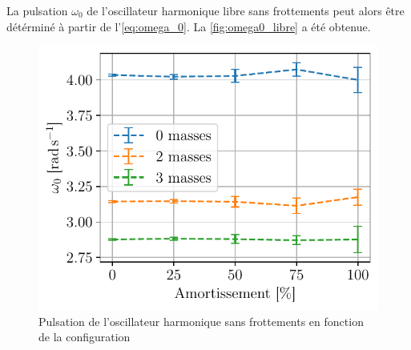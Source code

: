 La pulsation \(\omega_0\) de l'oscillateur harmonique libre sans frottements peut alors être détérminé à partir de l'\autoref{eq:omega_0}. La \autoref{fig:omega0_libre} a été obtenue.

\begin{figure}[h]
    \centering
    \includegraphics[width=0.5\linewidth]{figures/omega0_nomot.pdf}
    \caption{Pulsation de l'oscillateur harmonique sans frottements en fonction de la configuration}
    \label{fig:omega0_libre}
\end{figure}